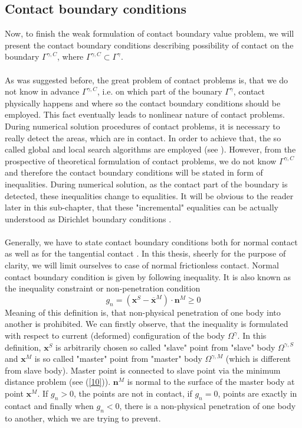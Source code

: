 \documentclass{article}
\newcommand{\beq}{\begin{equation}}
\newcommand{\eeq}{\end{equation}}
\begin{document}
\subsection{Contact boundary conditions}
Now, to finish the weak formulation of contact boundary value problem, we will present the contact boundary conditions describing possibility of contact on the boundary $ \Gamma^{\gamma,C}$, where $ \Gamma^{\gamma,C} \subset \Gamma^{\gamma} $.
\\
\\
As was suggested before, the great problem of contact problems is, that we do not know in advance $ \Gamma^{\gamma,C}$, i.e. on which part of the bounary $ \Gamma^{\gamma} $, contact physically happens and where so the contact boundary conditions should be employed. This fact eventually leads to nonlinear nature of contact problems. During numerical solution procedures of contact problems, it is necessary to really detect the areas, which are in contact. In order to achieve that, the so called global and local search algorithms are employed (see \cite[Chapter 9]{Wriggers}). However, from the prospective of theoretical formulation of contact problems, we do not know $ \Gamma^{\gamma,C}$ and therefore the contact boundary conditions will be stated in form of inequalities. During numerical solution, as the contact part of the boundary is detected, these inequalities change to equalities. It will be obvious to the reader later in this sub-chapter, that these "incremental" equalities can be actually understood as Dirichlet boundary conditions \cite[Chapter 4, p.109]{Yastrebov}.
\\
\\
Generally, we have to state contact boundary conditions both for normal contact as well as for the tangential contact \cite[Chapter 3, p.46]{Wriggers}. In this thesis, sheerly for the purpose of clarity, we will limit ourselves to case of normal frictionless contact. Normal contact boundary condition is given by following inequality. It is also known as the inequality constraint or non-penetration condition \cite[Chapter 3, p.47]{Wriggers}  
\beq\label{9}
g_{n}=\left(\mathbf{x}^{S}-\overline{\mathbf{x}}^{M}\right) \cdot \mathbf{n}^{M} \geq 0
\eeq  
Meaning of this definition is, that non-physical penetration of one body into another is  prohibited. We can firstly observe, that the inequality is formulated with respect to current (deformed) configuration of the body $\Omega^{\gamma} $. In this definition, $ \mathbf{x}^{S} $ is arbitrarily chosen so called "slave" point from "slave" body $\Omega^{\gamma,S} $ and $\mathbf{x}^{M} $ is so called "master" point from "master" body $\Omega^{\gamma,M} $ (which is different from slave body). Master point is connected to slave point via the minimum distance problem (see (\ref{10})). $ \mathbf{n}^{M} $ is normal to the surface of the master body at point $\mathbf{x}^{M} $. If $ g_{n} > 0 $, the points are not in contact, if $ g_{n} = 0 $, points are exactly in contact and finally when $ g_{n} < 0 $, there is a non-physical penetration of one body to another, which we are trying to prevent.   
\end{document}
